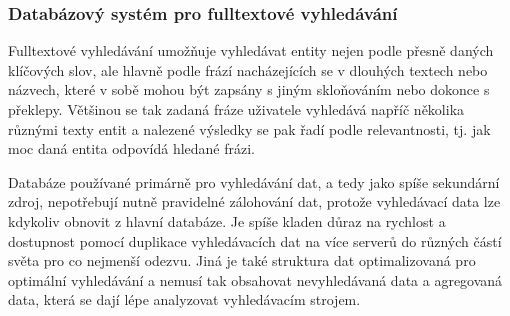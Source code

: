 		\subsubsection{Databázový systém pro fulltextové vyhledávání}

		Fulltextové vyhledávání umožňuje vyhledávat entity nejen podle přesně daných klíčových slov, ale hlavně podle
		frází nacházejících se v dlouhých textech nebo názvech, které v sobě mohou být zapsány s jiným skloňováním nebo
		dokonce s překlepy.
		Většinou se tak zadaná fráze uživatele vyhledává napříč několika různými texty entit a nalezené výsledky se pak
		řadí podle relevantnosti, tj. jak moc daná entita odpovídá hledané frázi.

		Databáze používané primárně pro vyhledávání dat, a tedy jako spíše sekundární zdroj, nepotřebují nutně pravidelné
		zálohování dat, protože vyhledávací data lze kdykoliv obnovit z hlavní databáze.
		Je spíše kladen důraz na rychlost a dostupnost pomocí duplikace vyhledávacích dat na více serverů do různých částí
		světa pro co nejmenší odezvu.
		Jiná je také struktura dat optimalizovaná pro optimální vyhledávání a nemusí tak obsahovat nevyhledávaná data
		a agregovaná data, která se dají lépe analyzovat vyhledávacím strojem.

